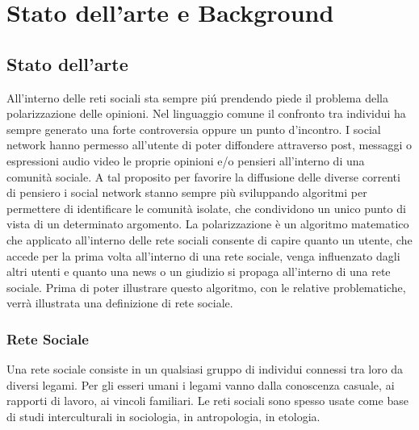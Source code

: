 \chapter{Stato dell'arte e Background}

\label{capitolo2}


\section{Stato dell'arte}
All'interno delle reti sociali sta sempre pi\'u prendendo piede il problema della polarizzazione delle opinioni. Nel linguaggio comune il confronto tra individui ha sempre generato una forte controversia oppure un punto d'incontro. 
I social network hanno permesso all'utente di poter diffondere attraverso post, messaggi o espressioni audio video le proprie opinioni e/o pensieri all'interno di una comunità sociale. A tal proposito per favorire la diffusione delle diverse correnti di pensiero i social network stanno sempre più sviluppando algoritmi per permettere di identificare le comunità isolate, che condividono un unico punto di vista di un determinato argomento.
La polarizzazione è un algoritmo matematico che applicato all'interno delle rete sociali consente di capire quanto un utente, che accede per la prima volta all'interno di una rete sociale, venga influenzato dagli altri utenti e quanto una news o un giudizio si propaga all'interno di una rete sociale.
Prima di poter illustrare questo algoritmo, con le relative problematiche, verrà illustrata una definizione di rete sociale.

\subsection{Rete Sociale}
Una rete sociale consiste in un qualsiasi gruppo di individui connessi tra loro da diversi legami. Per gli esseri umani i legami vanno dalla conoscenza casuale, ai rapporti di lavoro, ai vincoli familiari. Le reti sociali sono spesso usate come base di studi interculturali in sociologia, in antropologia, in etologia.

